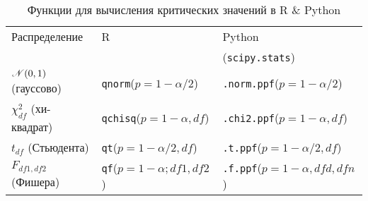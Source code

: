 \documentclass[12pt]{article}
\begin{document}
\begin{table}[h]
\caption{Функции для вычисления критических значений в R \& Python}
\begin{center}
\begin{tabular}{|l|l|l|}\hline
	Распределение & R & Python \\
	& & (\texttt{scipy.stats}) \\
	\hline\hline
	\({\mathscr N}(0,1)\) (гауссово) & \texttt{qnorm}($p=1-\alpha/2$) & \texttt{.norm.ppf}($p=1-\alpha/2$)\\ \hline
	\(\chi^2_{df}\) (хи-квадрат) & \texttt{qchisq}($p=1-\alpha, df$) & \texttt{.chi2.ppf}($p=1-\alpha,df$) \\ \hline
	\(t_{df}\) (Стьюдента) & \texttt{qt}($p=1-\alpha/2,df$) & \texttt{.t.ppf}($p=1-\alpha/2,df$) \\ \hline
	\(F_{df1,df2}\) (Фишера) & \texttt{qf}($p=1-\alpha;df1,df2$) & \texttt{.f.ppf}($p=1-\alpha,dfd,dfn$) \\
	\hline
\end{tabular}
\end{center}
\end{table}




\end{document}
